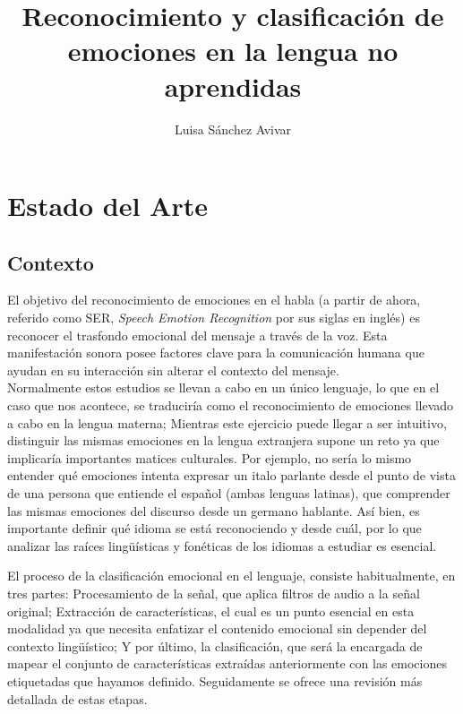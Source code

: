 \documentclass[11pt,a4paper,spanish]{book}
\begin{document}
	\title{Reconocimiento y clasificación de emociones en la lengua no aprendidas}
	\author{Luisa Sánchez Avivar}
	
	
	\chapter{Estado del Arte}
	\section{Contexto}
	El objetivo del reconocimiento de emociones en el habla (a partir de ahora, referido como  SER, \emph{Speech Emotion Recognition} por sus siglas en inglés) es reconocer el trasfondo emocional del mensaje a través de la voz. Esta manifestación sonora posee factores clave para la comunicación humana que ayudan en su interacción sin alterar el contexto del mensaje.\\
	Normalmente estos estudios se llevan a cabo en un único lenguaje, lo que en el caso que nos acontece, se traduciría como el reconocimiento de emociones llevado a cabo en la lengua materna; Mientras este ejercicio puede llegar a ser intuitivo, distinguir las mismas emociones en la lengua extranjera supone un reto ya que implicaría importantes matices culturales. Por ejemplo, no sería lo mismo entender qué emociones intenta expresar un italo parlante desde el punto de vista de una persona que entiende el español (ambas lenguas latinas), que comprender las mismas emociones del discurso desde un germano hablante. Así bien, es importante definir qué idioma se está reconociendo y desde cuál, por lo que analizar las raíces lingüísticas y fonéticas de los idiomas a estudiar es esencial. 
	
	El proceso de la clasificación emocional en el lenguaje, consiste habitualmente, en tres partes: Procesamiento de la señal, que aplica filtros de audio a la señal original; Extracción de características, el cual es un punto esencial en esta modalidad ya que necesita enfatizar el contenido emocional sin depender del contexto lingüístico; Y por último, la clasificación, que será la encargada de mapear el conjunto de características extraídas anteriormente con las emociones etiquetadas que hayamos definido. Seguidamente se ofrece una revisión más detallada de estas etapas.
		
\end{document}
